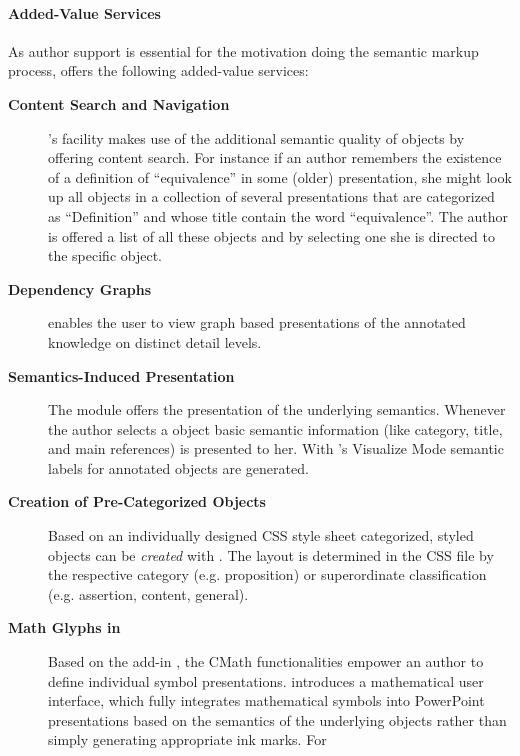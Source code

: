 \paragraph{Added-Value Services}\label{sec:auxiliaries}
As author support is essential for the motivation doing the semantic markup process,
{\cpoint} offers the following added-value services:
\begin{description}
\item[{\bf{Content Search and
      Navigation}}] {\cpoint}'s
  {} facility makes use of the additional semantic quality of {\ppt} objects
  by offering content search. For instance if an author remembers the existence of a
  definition of ``equivalence'' in some (older) {\ppt} presentation, she might look up all
  {\ppt} objects in a collection of several {\ppt} presentations that are categorized as
  ``Definition'' and whose title contain the word ``equivalence''. The author is offered a list
  of all these objects and by selecting one she is directed to the specific {\ppt} object.
\item[{\bf Dependency Graphs}] {\cpgraphs} enables the user to
  view graph based presentations of the annotated knowledge on distinct detail levels.
\item[{\bf Semantics-Induced Presentation}] The
  module {\cpauthor} offers the presentation of the underlying semantics. Whenever the
  author selects a {\ppt} object basic semantic information (like category, title, and
  main references) is presented to her. With {\cpoint}'s Visualize Mode semantic labels
  for annotated {\ppt} objects are generated.
\item[{\bf Creation of Pre-Categorized {\ppt} Objects}] Based on an individually designed
  CSS style sheet categorized, styled {\ppt} objects can be {\emph{created}} with
  {\cpauthor}. The layout is determined in the CSS file by the respective category (e.g.
  proposition) or superordinate classification (e.g. assertion, content, general).
\item[{\bf Math Glyphs in {\ppt}}] Based on the {\ppt} add-in
  {\texpoint}, the CMath functionalities empower an author to define individual symbol
  presentations. {\cpoint} introduces a mathematical user interface, which fully
  integrates mathematical symbols into PowerPoint presentations based on the semantics of
  the underlying objects rather than simply generating appropriate ink marks. For

\end{description}
